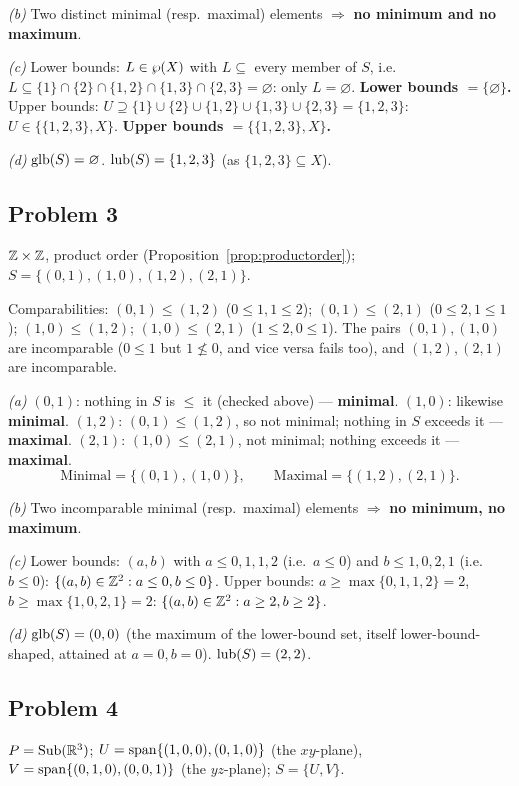\emph{(b)} Two distinct minimal (resp.\ maximal) elements $\Rightarrow$ \textbf{no minimum and no maximum}.

\emph{(c)} Lower bounds: $L\in\wp(X)$ with $L\subseteq$ every member of $S$, i.e.\ $L\subseteq\{1\}\cap\{2\}\cap\{1,2\}\cap\{1,3\}\cap\{2,3\}=\varnothing$: only $L=\varnothing$. \textbf{Lower bounds $=\{\varnothing\}$.} Upper bounds: $U\supseteq\{1\}\cup\{2\}\cup\{1,2\}\cup\{1,3\}\cup\{2,3\}=\{1,2,3\}$: $U\in\{\{1,2,3\},X\}$. \textbf{Upper bounds $=\{\{1,2,3\},X\}$.}

\emph{(d)} $\operatorname{glb}(S)=\varnothing$. $\operatorname{lub}(S)=\{1,2,3\}$ (as $\{1,2,3\}\subseteq X$).

\subsection*{Problem 3}
$\mathbb{Z}\times\mathbb{Z}$, product order (Proposition~\ref{prop:productorder}); $S=\{(0,1),(1,0),(1,2),(2,1)\}$.

Comparabilities: $(0,1)\le(1,2)$ ($0\le1,1\le2$); $(0,1)\le(2,1)$ ($0\le2,1\le1$); $(1,0)\le(1,2)$; $(1,0)\le(2,1)$ ($1\le2,0\le1$). The pairs $(0,1),(1,0)$ are incomparable ($0\le1$ but $1\not\le0$, and vice versa fails too), and $(1,2),(2,1)$ are incomparable.

\emph{(a)} $(0,1)$: nothing in $S$ is $\le$ it (checked above) — \textbf{minimal}. $(1,0)$: likewise \textbf{minimal}. $(1,2)$: $(0,1)\le(1,2)$, so not minimal; nothing in $S$ exceeds it — \textbf{maximal}. $(2,1)$: $(1,0)\le(2,1)$, not minimal; nothing exceeds it — \textbf{maximal}.
\[
\text{Minimal}=\{(0,1),(1,0)\},\qquad\text{Maximal}=\{(1,2),(2,1)\}.
\]

\emph{(b)} Two incomparable minimal (resp.\ maximal) elements $\Rightarrow$ \textbf{no minimum, no maximum}.

\emph{(c)} Lower bounds: $(a,b)$ with $a\le0,1,1,2$ (i.e.\ $a\le0$) and $b\le1,0,2,1$ (i.e.\ $b\le0$): $\{(a,b)\in\mathbb{Z}^2:a\le0,b\le0\}$. Upper bounds: $a\ge\max\{0,1,1,2\}=2$, $b\ge\max\{1,0,2,1\}=2$: $\{(a,b)\in\mathbb{Z}^2:a\ge2,b\ge2\}$.

\emph{(d)} $\operatorname{glb}(S)=(0,0)$ (the maximum of the lower-bound set, itself lower-bound-shaped, attained at $a=0,b=0$). $\operatorname{lub}(S)=(2,2)$.

\subsection*{Problem 4}
$P=\mathrm{Sub}(\mathbb{R}^3)$; $U=\operatorname{span}\{(1,0,0),(0,1,0)\}$ (the $xy$-plane), $V=\operatorname{span}\{(0,1,0),(0,0,1)\}$ (the $yz$-plane); $S=\{U,V\}$.

